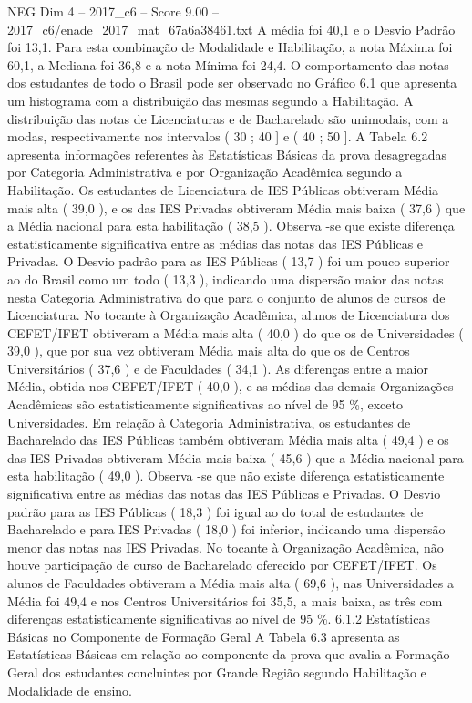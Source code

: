 \begin{textsample}{NEG Dim 4 – 2017\_c6 – Score 9.00 – 2017\_c6/enade\_2017\_mat\_67a6a38461.txt}
A média foi 40,1 e o Desvio Padrão foi 13,1.
Para esta combinação de Modalidade e Habilitação, a nota Máxima foi 60,1, a Mediana foi 36,8 e a nota Mínima foi 24,4.
O comportamento das notas dos estudantes de todo o Brasil pode ser observado no Gráfico 6.1 que apresenta um histograma com a distribuição das mesmas segundo a Habilitação.
A distribuição das notas de Licenciaturas e de Bacharelado são unimodais, com a modas, respectivamente nos intervalos ( 30 ; 40 ] e ( 40 ; 50 ].
A Tabela 6.2 apresenta informações referentes às Estatísticas Básicas da prova desagregadas por Categoria Administrativa e por Organização Acadêmica segundo a Habilitação.
Os estudantes de Licenciatura de IES Públicas obtiveram Média mais alta ( 39,0 ), e os das IES Privadas obtiveram Média mais baixa ( 37,6 ) que a Média nacional para esta habilitação ( 38,5 ).
Observa -se que existe diferença estatisticamente significativa entre as médias das notas das IES Públicas e Privadas.
O Desvio padrão para as IES Públicas ( 13,7 ) foi um pouco superior ao do Brasil como um todo ( 13,3 ), indicando uma dispersão maior das notas nesta Categoria Administrativa do que para o conjunto de alunos de cursos de Licenciatura.
No tocante à Organização Acadêmica, alunos de Licenciatura dos CEFET/IFET obtiveram a Média mais alta ( 40,0 ) do que os de Universidades ( 39,0 ), que por sua vez obtiveram Média mais alta do que os de Centros Universitários ( 37,6 ) e de Faculdades ( 34,1 ).
As diferenças entre a maior Média, obtida nos CEFET/IFET ( 40,0 ), e as médias das demais Organizações Acadêmicas são estatisticamente significativas ao nível de 95 \%, exceto Universidades.
Em relação à Categoria Administrativa, os estudantes de Bacharelado das IES Públicas também obtiveram Média mais alta ( 49,4 ) e os das IES Privadas obtiveram Média mais baixa ( 45,6 ) que a Média nacional para esta habilitação ( 49,0 ).
Observa -se que não existe diferença estatisticamente significativa entre as médias das notas das IES Públicas e Privadas.
O Desvio padrão para as IES Públicas ( 18,3 ) foi igual ao do total de estudantes de Bacharelado e para IES Privadas ( 18,0 ) foi inferior, indicando uma dispersão menor das notas nas IES Privadas.
No tocante à Organização Acadêmica, não houve participação de curso de Bacharelado oferecido por CEFET/IFET.
Os alunos de Faculdades obtiveram a Média mais alta ( 69,6 ), nas Universidades a Média foi 49,4 e nos Centros Universitários foi 35,5, a mais baixa, as três com diferenças estatisticamente significativas ao nível de 95 \%. 6.1.2 Estatísticas Básicas no Componente de Formação Geral A Tabela 6.3 apresenta as Estatísticas Básicas em relação ao componente da prova que avalia a Formação Geral dos estudantes concluintes por Grande Região segundo Habilitação e Modalidade de ensino.

\end{textsample}
